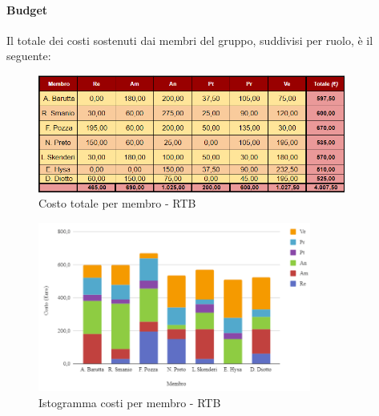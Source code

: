 \paragraph{Budget}
Il totale dei costi sostenuti dai membri del gruppo, suddivisi per ruolo, è il seguente:
\begin{figure}[H]
    \centering
    \includegraphics[width=0.9\textwidth]{../Images/RiepilogoPrezziRTB.png}
    \caption{Costo totale per membro  - RTB}
    \label{fig:CostiRTB}
\end{figure}
\begin{figure}[H]
    \centering
    \includegraphics[width=0.8\textwidth]{../Images/graficoCostoRuoloRTB.png}
    \caption{Istogramma costi per membro  - RTB}
    \label{fig:GraficoCostoRTB}
\end{figure}